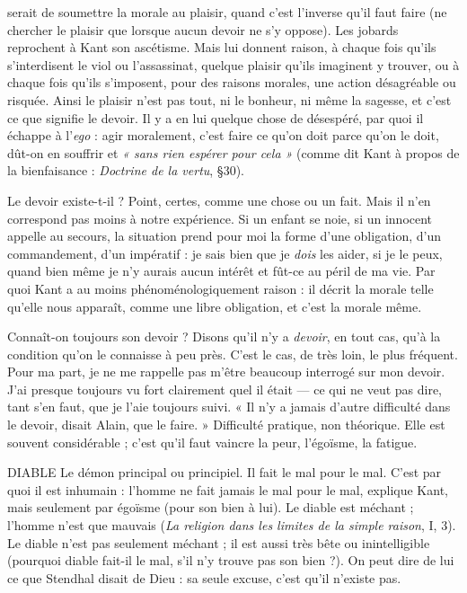 serait de soumettre la morale au plaisir, quand c’est l'inverse qu’il faut faire (ne
chercher le plaisir que lorsque aucun devoir ne s’y oppose). Les jobards reprochent
à Kant son ascétisme. Mais lui donnent raison, à chaque fois qu'ils
s’interdisent le viol ou l'assassinat, quelque plaisir qu’ils imaginent y trouver,
ou à chaque fois qu’ils s'imposent, pour des raisons morales, une action désagréable
ou risquée. Ainsi le plaisir n’est pas tout, ni le bonheur, ni même la
sagesse, et c’est ce que signifie le devoir. Il y a en lui quelque chose de désespéré,
par quoi il échappe à l’{\it ego} : agir moralement, c’est faire ce qu’on doit parce
qu’on le doit, dût-on en souffrir et {\it « sans rien espérer pour cela »} (comme dit
Kant à propos de la bienfaisance : {\it Doctrine de la vertu}, \S 30).

Le devoir existe-t-il ? Point, certes, comme une chose ou un fait. Mais il
n’en correspond pas moins à notre expérience. Si un enfant se noie, si un innocent
appelle au secours, la situation prend pour moi la forme d’une obligation,
d’un commandement, d’un impératif : je sais bien que je {\it dois} les aider, si je le
peux, quand bien même je n’y aurais aucun intérêt et fût-ce au péril de ma vie.
Par quoi Kant a au moins phénoménologiquement raison : il décrit la morale
telle qu’elle nous apparaît, comme une libre obligation, et c’est la morale
même.

Connaît-on toujours son devoir ? Disons qu’il n’y a {\it devoir}, en tout cas,
qu’à la condition qu’on le connaisse à peu près. C’est le cas, de très loin, le
plus fréquent. Pour ma part, je ne me rappelle pas m'être beaucoup interrogé
sur mon devoir. J'ai presque toujours vu fort clairement quel il était — ce qui
ne veut pas dire, tant s’en faut, que je l’aie toujours suivi. « Il n’y a jamais
d’autre difficulté dans le devoir, disait Alain, que le faire. » Difficulté pratique,
non théorique. Elle est souvent considérable ; c’est qu’il faut vaincre la
peur, l’égoïsme, la fatigue.

DIABLE Le démon principal ou principiel. Il fait le mal pour le mal. C’est
par quoi il est inhumain : l’homme ne fait jamais le mal pour le
mal, explique Kant, mais seulement par égoïsme (pour son bien à lui). Le
diable est méchant ; l’homme n’est que mauvais ({\it La religion dans les limites de
la simple raison}, I, 3).
Le diable n’est pas seulement méchant ; il est aussi très bête ou inintelligible
(pourquoi diable fait-il le mal, s’il n’y trouve pas son bien ?). On peut dire de
lui ce que Stendhal disait de Dieu : sa seule excuse, c’est qu’il n’existe pas.

